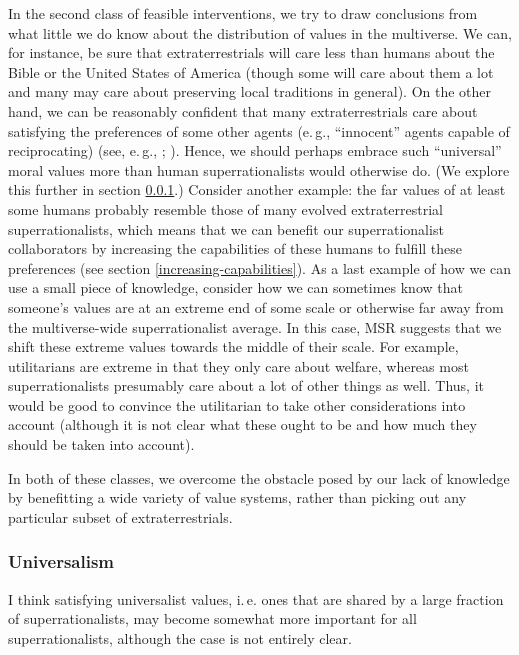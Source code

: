 In the second class of feasible interventions, we try to draw
conclusions from what little we do know about the distribution of values
in the multiverse. We can, for instance, be sure that extraterrestrials
will care less than humans about the Bible or the United States of
America (though some will care about them a lot and many may care about
preserving local traditions in general). On the other hand, we can be
reasonably confident that many extraterrestrials care about satisfying
the preferences of some other agents (e.\,g., ``innocent'' agents capable
of reciprocating) (see, e.\,g.,
\cite{Axelrod2006-ci,Trivers1971-rb,Fehr1999-pd,Dawkins1976-cd,Taylor1987-wn}; \cite[chapter 9]{Buss2015-kp}).
Hence, we should perhaps embrace such ``universal'' moral values more
than human superrationalists would otherwise do. (We explore this
further in section
\ref{universalism}.) Consider
another example: the far values of at least some humans probably
resemble those of many evolved extraterrestrial superrationalists, which
means that we can benefit our superrationalist collaborators by
increasing the capabilities of these humans to fulfill these preferences
(see section
\ref{increasing-capabilities}). As a last example of how we can use a small piece of
knowledge, consider how we can sometimes know that someone's values are
at an extreme end of some scale or otherwise far away from the
multiverse-wide superrationalist average. In this case, MSR suggests
that we shift these extreme values towards the middle of their scale.
For example, utilitarians are extreme in that they only care about
welfare, whereas most superrationalists presumably care about a lot of
other things as well. Thus, it would be good to convince the utilitarian
to take other considerations into account (although it is not clear what
these ought to be and how much they should be taken into account).

In both of these classes, we overcome the obstacle posed by our lack of
knowledge by benefitting a wide variety of value systems, rather than
picking out any particular subset of extraterrestrials.

\hypertarget{universalism}{\subsubsection{Universalism}\label{universalism}}

I think satisfying universalist values, i.\,e. ones that are shared by a
large fraction of superrationalists, may become somewhat more important
for all superrationalists, although the case is not entirely clear.

